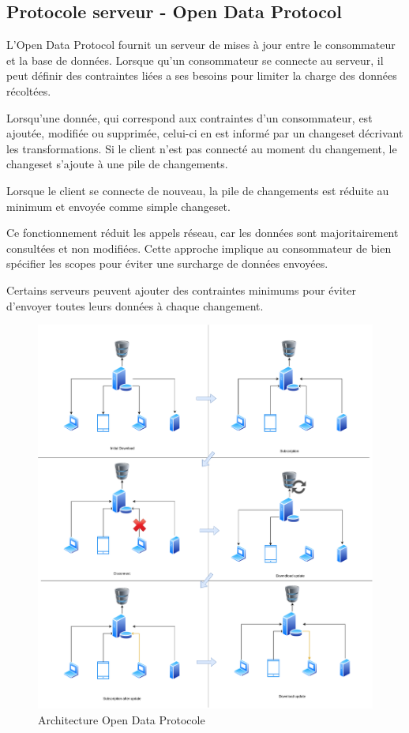 \subsection{Protocole serveur - Open Data Protocol}

L'Open Data Protocol fournit un serveur de mises à jour entre le consommateur et la base de données.
Lorsque qu'un consommateur se connecte au serveur, il peut définir des contraintes liées a ses besoins
pour limiter la charge des données récoltées.

Lorsqu'une donnée, qui correspond aux contraintes d'un consommateur, est ajoutée, modifiée ou supprimée,
celui-ci en est informé par un changeset décrivant les transformations.
Si le client n'est pas connecté au moment du changement, le changeset s'ajoute à une pile
de changements.

Lorsque le client se connecte de nouveau, la pile de changements est réduite au minimum et envoyée
comme simple changeset.

Ce fonctionnement réduit les appels réseau, car les données sont majoritairement consultées et non modifiées.
Cette approche implique au consommateur de bien spécifier les scopes pour éviter une surcharge de données
envoyées.

Certains serveurs peuvent ajouter des contraintes minimums pour éviter d'envoyer toutes leurs données
à chaque changement.

\begin{figure}[h!]
  \centering
  \includegraphics[scale=0.19]{media/open_data_protocol.png}
  \caption{Architecture Open Data Protocole}
\end{figure}



